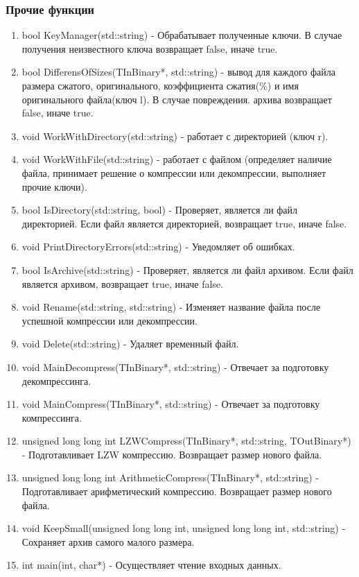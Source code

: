 \documentclass[12pt]{article}
\begin{document}
\subsubsection*{Прочие функции}
\noindent
\begin{enumerate}
	\item bool KeyManager(std::string) - Обрабатывает полученные ключи. В случае получения неизвестного ключа возвращает false, иначе true.
	\item bool DifferensOfSizes(TInBinary*, std::string) - вывод для каждого файла размера сжатого, оригинального, коэффициента сжатия(\%) и имя оригинального файла(ключ l). В случае повреждения. архива возвращает false, иначе true.
	\item void WorkWithDirectory(std::string) - работает с директорией (ключ r).
	\item void WorkWithFile(std::string) - работает с файлом (определяет наличие файла, принимает решение о компрессии или декомпрессии, выполняет прочие ключи).
	\item bool IsDirectory(std::string, bool) - Проверяет, является ли файл директорией. Если файл является директорией, возвращает true, иначе false.
	\item void PrintDirectoryErrors(std::string) - Уведомляет об ошибках.
	\item bool IsArchive(std::string) - Проверяет, является ли файл архивом. Если файл является архивом, возвращает true, иначе false.
	\item void Rename(std::string, std::string) - Изменяет название файла после успешной компрессии или декомпрессии.
	\item void Delete(std::string) - Удаляет временный файл.
	\item void MainDecompress(TInBinary*, std::string) - Отвечает за подготовку декомпрессинга.
	\item void MainCompress(TInBinary*, std::string) - Отвечает за подготовку компрессинга.
	\item unsigned long long int LZWCompress(TInBinary*, std::string, TOutBinary*) - Подготавливает LZW компрессию. Возвращает размер нового файла.
	\item unsigned long long int ArithmeticCompress(TInBinary*, std::string) - Подготавливает арифметический компрессию. Возвращает размер нового файла.
	\item void KeepSmall(unsigned long long int, unsigned long long int, std::string) - Сохраняет архив самого малого размера.
	\item int main(int, char*) - Осуществляет чтение входных данных.
\end{enumerate}
\end{document}
